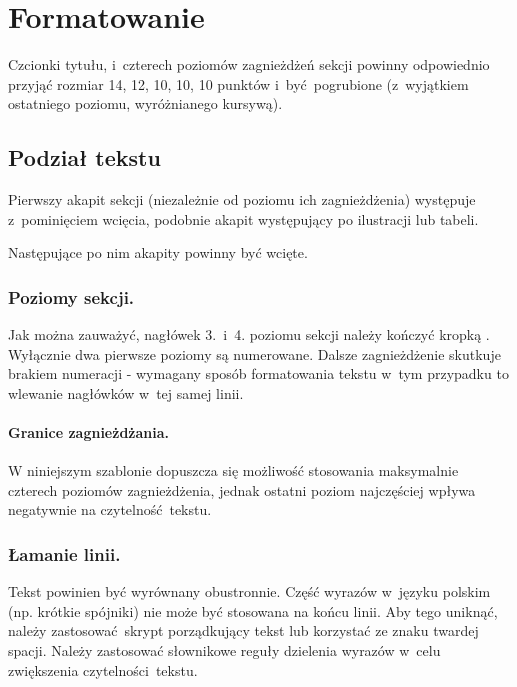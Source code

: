 \section{Formatowanie}
\label{sec:formatting}

Czcionki tytułu, i~czterech poziomów zagnieżdżeń sekcji powinny odpowiednio przyjąć rozmiar 14, 12, 10, 10, 10 punktów i~być pogrubione (z~wyjątkiem ostatniego poziomu, wyróżnianego kursywą).

\subsection{Podział tekstu}
\label{subsec:textDivision}

Pierwszy akapit sekcji (niezależnie od poziomu ich zagnieżdżenia) występuje z~pominięciem wcięcia, podobnie akapit występujący po ilustracji lub tabeli.

Następujące po nim akapity powinny być wcięte.

\subsubsection{Poziomy sekcji.}
\label{subsubsec:levels}

Jak można zauważyć, nagłówek 3.~i~4. poziomu sekcji należy kończyć kropką \cite{ref:lncs}. Wyłącznie dwa pierwsze poziomy są numerowane. Dalsze zagnieżdżenie skutkuje brakiem numeracji - wymagany sposób formatowania tekstu w~tym przypadku to wlewanie nagłówków w~tej samej linii.

\paragraph{Granice zagnieżdżania.}
\label{par:nestingLimits}

W niniejszym szablonie dopuszcza się możliwość stosowania maksymalnie czterech poziomów zagnieżdżenia, jednak ostatni poziom najczęściej wpływa negatywnie na czytelność tekstu.

\subsubsection{Łamanie linii.}
\label{subsubsec:linebreak}

Tekst powinien być wyrównany obustronnie. Część wyrazów w~języku polskim (np. krótkie spójniki) nie może być stosowana na końcu linii. Aby tego uniknąć, należy zastosować skrypt porządkujący tekst lub korzystać ze znaku twardej spacji. Należy zastosować słownikowe reguły dzielenia wyrazów w~celu zwiększenia czytelności tekstu.

